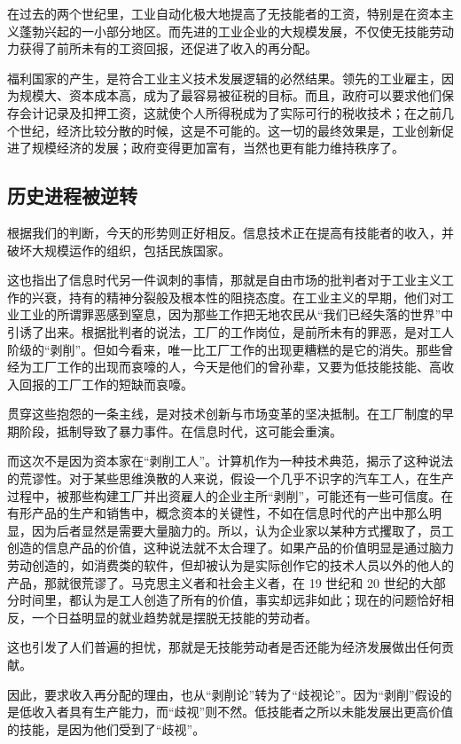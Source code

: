 在过去的两个世纪里，工业自动化极大地提高了无技能者的工资，特别是在资本主义蓬勃兴起的一小部分地区。而先进的工业企业的大规模发展，不仅使无技能劳动力获得了前所未有的工资回报，还促进了收入的再分配。

福利国家的产生，是符合工业主义技术发展逻辑的必然结果。领先的工业雇主，因为规模大、资本成本高，成为了最容易被征税的目标。而且，政府可以要求他们保存会计记录及扣押工资，这就使个人所得税成为了实际可行的税收技术；在之前几个世纪，经济比较分散的时候，这是不可能的。这一切的最终效果是，工业创新促进了规模经济的发展；政府变得更加富有，当然也更有能力维持秩序了。

\subsection{历史进程被逆转}
根据我们的判断，今天的形势则正好相反。信息技术正在提高有技能者的收入，并破坏大规模运作的组织，包括民族国家。

这也指出了信息时代另一件讽刺的事情，那就是自由市场的批判者对于工业主义工作的兴衰，持有的精神分裂般及根本性的阻挠态度。在工业主义的早期，他们对工业工业的所谓罪恶感到窒息，因为那些工作把无地农民从“我们已经失落的世界”中引诱了出来。根据批判者的说法，工厂的工作岗位，是前所未有的罪恶，是对工人阶级的“剥削”。但如今看来，唯一比工厂工作的出现更糟糕的是它的消失。那些曾经为工厂工作的出现而哀嚎的人，今天是他们的曾孙辈，又要为低技能技能、高收入回报的工厂工作的短缺而哀嚎。

贯穿这些抱怨的一条主线，是对技术创新与市场变革的坚决抵制。在工厂制度的早期阶段，抵制导致了暴力事件。在信息时代，这可能会重演。

而这次不是因为资本家在“剥削工人”。计算机作为一种技术典范，揭示了这种说法的荒谬性。对于某些思维涣散的人来说，假设一个几乎不识字的汽车工人，在生产过程中，被那些构建工厂并出资雇人的企业主所“剥削”，可能还有一些可信度。在有形产品的生产和销售中，概念资本的关键性，不如在信息时代的产出中那么明显，因为后者显然是需要大量脑力的。所以，认为企业家以某种方式攫取了，员工创造的信息产品的价值，这种说法就不太合理了。如果产品的价值明显是通过脑力劳动创造的，如消费类的软件，但却被认为是实际创作它的技术人员以外的他人的产品，那就很荒谬了。马克思主义者和社会主义者，在 19 世纪和 20 世纪的大部分时间里，都认为是工人创造了所有的价值，事实却远非如此；现在的问题恰好相反，一个日益明显的就业趋势就是摆脱无技能的劳动者。

这也引发了人们普遍的担忧，那就是无技能劳动者是否还能为经济发展做出任何贡献。

因此，要求收入再分配的理由，也从“剥削论”转为了“歧视论”。因为“剥削”假设的是低收入者具有生产能力，而“歧视”则不然。低技能者之所以未能发展出更高价值的技能，是因为他们受到了“歧视”。

